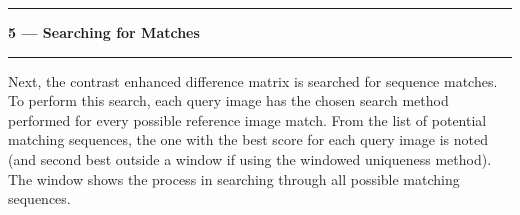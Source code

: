 \noindent\rule{\textwidth}{1pt}
\indent \textbf{5 --- Searching for Matches}
\noindent\rule{\textwidth}{1pt}
\smallskip
\parbox{\textwidth}{Next, the contrast enhanced difference matrix is searched for sequence matches. To perform this search, each query image has the chosen search method performed for every possible reference image match. From the list of potential matching sequences, the one with the best score for each query image is noted (and second best outside a window if using the windowed uniqueness method). The window shows the process in searching through all possible matching sequences.}
\smallskip
